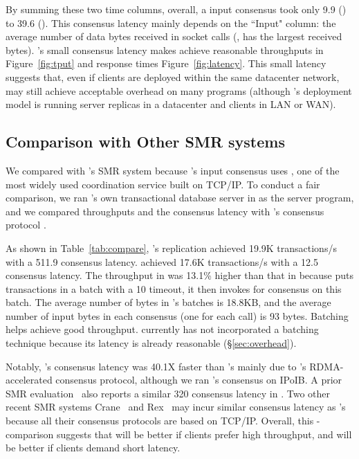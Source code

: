 By summing these two time columns, overall, a \xxx input consensus took only 
9.9 \us (\redis) to 39.6 \us (\mongodb). This consensus latency mainly depends 
on the ``Input" column: the average number of data bytes received in socket 
calls (\eg, \mongodb has the largest received bytes). \xxx's small consensus 
latency makes \xxx achieve reasonable throughputs in Figure~\ref{fig:tput} and 
response times Figure~\ref{fig:latency}. This small latency suggests that, even 
if clients are deployed within the same datacenter network, \xxx may still 
achieve acceptable overhead on many programs (although \xxx's deployment 
model is running server replicas in a datacenter and clients in LAN 
or WAN).

\subsection{Comparison with Other SMR systems} \label{sec:compare}

We compared \xxx with \calvin's SMR system because \calvin's input consensus 
uses \zookeeper, one of the most widely used coordination service built on 
TCP/IP. To conduct a fair comparison, we ran \calvin's own transactional 
database server in \xxx as the server program, and we compared throughputs and 
the consensus latency with \calvin's consensus protocol \zookeeper.

As shown in Table~\ref{tab:compare}, \calvin's \zookeeper replication achieved 
19.9K transactions/s with a 511.9 \us consensus latency. \xxx achieved 17.6K 
transactions/s with a 12.5 \us consensus latency. The throughput in \calvin 
was 13.1\% higher than that in \xxx because \calvin puts transactions in a 
batch with a 10 \ms timeout, it then invokes \zookeeper for consensus on 
this batch. The average number of bytes in \calvin's batches is 18.8KB, and 
the average number of input bytes in each \xxx consensus (one for each \myread 
call) is 93 bytes. Batching helps \calvin achieve good throughput. \xxx 
currently has not incorporated a batching technique because its latency is 
already reasonable (\S\ref{sec:overhead}).

Notably, \xxx's consensus latency was 40.1X faster than \zookeeper's mainly due 
to \xxx's RDMA-accelerated consensus protocol, although we ran \calvin's 
\zookeeper consensus on IPoIB. A prior SMR evaluation~\cite{dare:hpdc15} also 
reports a similar 320 \us consensus latency in \zookeeper. Two other recent SMR 
systems Crane~\cite{crane:sosp15} and Rex~\cite{rex:eurosys14} may incur similar 
consensus latency as \zookeeper's because all their consensus protocols are 
based on TCP/IP. Overall, this \xxx-\calvin comparison suggests that \calvin 
will be better if clients prefer high throughput, and \xxx will be better if 
clients demand short latency.

